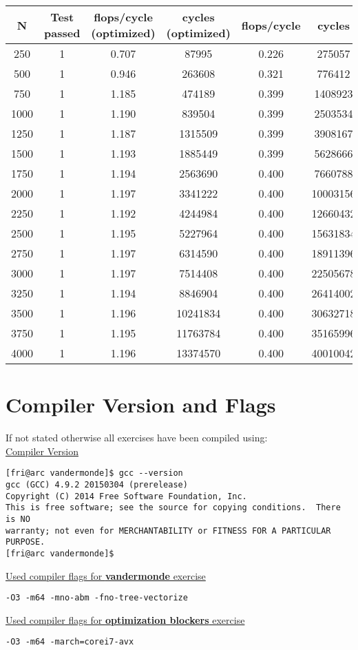 \documentclass[10pt,a4paper,oneside,notitlepage]{report}
\begin{document}
\begin{tabular}{|c|c|c|c|c|c|}
\hline
\rowcolor{gray!30} 
\textbf{N} & \textbf{Test passed} & \textbf{flops/cycle (optimized)} & \textbf{cycles (optimized)} & \textbf{flops/cycle} & \textbf{cycles} \\ 
\hline 
250 & 1 & 0.707 & 87995 & 0.226 & 275057 \\ \hline
500 & 1 & 0.946 & 263608 & 0.321 & 776412 \\ \hline
750 & 1 & 1.185 & 474189 & 0.399 & 1408923 \\ \hline
1000 & 1 & 1.190 & 839504 & 0.399 & 2503534 \\ \hline
1250 & 1 & 1.187 & 1315509 & 0.399 & 3908167 \\ \hline
1500 & 1 & 1.193 & 1885449 & 0.399 & 5628666 \\ \hline
1750 & 1 & 1.194 & 2563690 & 0.400 & 7660788 \\ \hline
2000 & 1 & 1.197 & 3341222 & 0.400 & 10003156 \\ \hline
2250 & 1 & 1.192 & 4244984 & 0.400 & 12660432 \\ \hline
2500 & 1 & 1.195 & 5227964 & 0.400 & 15631834 \\ \hline
2750 & 1 & 1.197 & 6314590 & 0.400 & 18911396 \\ \hline
3000 & 1 & 1.197 & 7514408 & 0.400 & 22505678 \\ \hline
3250 & 1 & 1.194 & 8846904 & 0.400 & 26414002 \\ \hline
3500 & 1 & 1.196 & 10241834 & 0.400 & 30632718 \\ \hline
3750 & 1 & 1.195 & 11763784 & 0.400 & 35165996 \\ \hline
4000 & 1 & 1.196 & 13374570 & 0.400 & 40010042 \\ \hline
\end{tabular} 

\newpage

\section*{Compiler Version and Flags}
\label{compiler_version}
If not stated otherwise all exercises have been compiled using: \\ 

\underline{Compiler Version}
\begin{verbatim}
[fri@arc vandermonde]$ gcc --version
gcc (GCC) 4.9.2 20150304 (prerelease)
Copyright (C) 2014 Free Software Foundation, Inc.
This is free software; see the source for copying conditions.  There is NO
warranty; not even for MERCHANTABILITY or FITNESS FOR A PARTICULAR PURPOSE.
[fri@arc vandermonde]$
\end{verbatim}

\underline{Used compiler flags for \textbf{vandermonde} exercise} 
\begin{verbatim}
-O3 -m64 -mno-abm -fno-tree-vectorize
\end{verbatim}

\underline{Used compiler flags for \textbf{optimization blockers} exercise} 
\begin{verbatim}
-O3 -m64 -march=corei7-avx
\end{verbatim}
\end{document}
